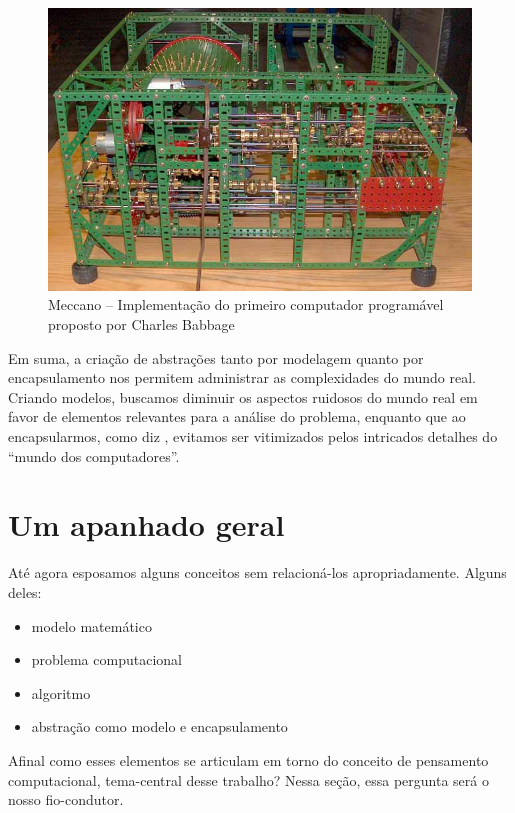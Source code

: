 \begin{figure}[!htb]
	\caption{Meccano -- Implementação do primeiro computador programável proposto por Charles Babbage }\label{fig:meccano}
	\begin{center}
		\includegraphics[scale=0.45]{imagens/babbage}
	\end{center}
\end{figure}

Em suma, a criação de abstrações tanto por modelagem quanto por encapsulamento nos permitem administrar as complexidades do mundo real. Criando modelos, buscamos diminuir os aspectos ruidosos do mundo real em favor de elementos relevantes para a análise do problema, enquanto que ao encapsularmos, como diz , evitamos ser vitimizados pelos intricados detalhes do ``mundo dos computadores''.

\section{Um apanhado geral}

Até agora esposamos alguns conceitos sem relacioná-los apropriadamente. Alguns deles:

\begin{itemize}
	\item modelo matemático
	\item problema computacional
	\item algoritmo
	\item abstração como modelo e encapsulamento
\end{itemize}
	
Afinal como esses elementos se articulam em torno do conceito de pensamento computacional, tema-central desse trabalho? Nessa seção, essa pergunta será o nosso fio-condutor.

